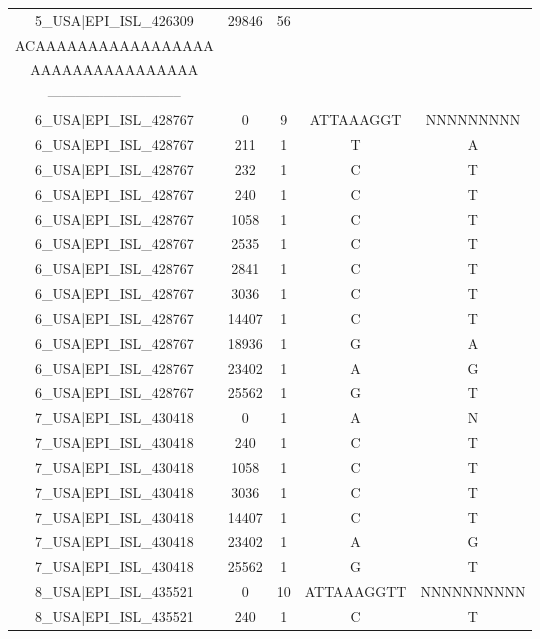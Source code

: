 \documentclass[a4paper,10pt]{article}
\begin{document}
\begin{longtable}{@{}ccccc@{}}
5\_USA|EPI\_ISL\_426309 & 29846 & 56 & \begin{tabular}[c]{@{}c@{}}TAATAGCTTCTTAGGAGAATG\\ ACAAAAAAAAAAAAAAAAA\\ AAAAAAAAAAAAAAAA\end{tabular} & \begin{tabular}[c]{@{}c@{}}---------------------------\\ -----------------------------\end{tabular} \\* \midrule
6\_USA|EPI\_ISL\_428767 & 0 & 9 & ATTAAAGGT & NNNNNNNNN \\* \midrule
6\_USA|EPI\_ISL\_428767 & 211 & 1 & T & A \\* \midrule
6\_USA|EPI\_ISL\_428767 & 232 & 1 & C & T \\* \midrule
6\_USA|EPI\_ISL\_428767 & 240 & 1 & C & T \\* \midrule
6\_USA|EPI\_ISL\_428767 & 1058 & 1 & C & T \\* \midrule
6\_USA|EPI\_ISL\_428767 & 2535 & 1 & C & T \\* \midrule
6\_USA|EPI\_ISL\_428767 & 2841 & 1 & C & T \\* \midrule
6\_USA|EPI\_ISL\_428767 & 3036 & 1 & C & T \\* \midrule
6\_USA|EPI\_ISL\_428767 & 14407 & 1 & C & T \\* \midrule
6\_USA|EPI\_ISL\_428767 & 18936 & 1 & G & A \\* \midrule
6\_USA|EPI\_ISL\_428767 & 23402 & 1 & A & G \\* \midrule
6\_USA|EPI\_ISL\_428767 & 25562 & 1 & G & T \\* \midrule
7\_USA|EPI\_ISL\_430418 & 0 & 1 & A & N \\* \midrule
7\_USA|EPI\_ISL\_430418 & 240 & 1 & C & T \\* \midrule
7\_USA|EPI\_ISL\_430418 & 1058 & 1 & C & T \\* \midrule
7\_USA|EPI\_ISL\_430418 & 3036 & 1 & C & T \\* \midrule
7\_USA|EPI\_ISL\_430418 & 14407 & 1 & C & T \\* \midrule
7\_USA|EPI\_ISL\_430418 & 23402 & 1 & A & G \\* \midrule
7\_USA|EPI\_ISL\_430418 & 25562 & 1 & G & T \\* \midrule
8\_USA|EPI\_ISL\_435521 & 0 & 10 & ATTAAAGGTT & NNNNNNNNNN \\* \midrule
8\_USA|EPI\_ISL\_435521 & 240 & 1 & C & T \\* \midrule

\end{longtable}
\end{document}
